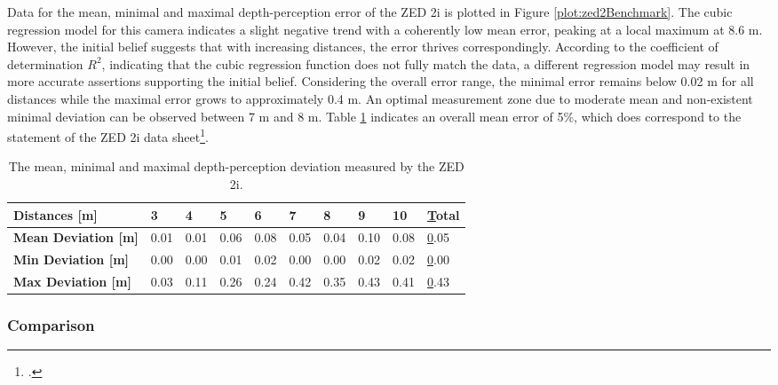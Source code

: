 Data for the mean, minimal and maximal depth-perception error of the ZED 2i is plotted in Figure \ref{plot:zed2Benchmark}.
The cubic regression model for this camera indicates a slight negative trend with a coherently low mean error, peaking at a local maximum at 8.6 m. However, the initial belief suggests that with increasing distances, the error thrives correspondingly. According to the coefficient of determination $R^{2}$, indicating that the cubic regression function does not fully match the data, a different regression model may result in more accurate assertions supporting the initial belief. 
Considering the overall error range, the minimal error remains below 0.02 m for all distances while the maximal error grows to approximately 0.4 m. 
An optimal measurement zone due to moderate mean and non-existent minimal deviation can be observed between 7 m and 8 m. 
Table \ref{tab:resultsZed2} indicates an overall mean error of 5\%, which does correspond to the statement of the ZED 2i data sheet\footcite{zed2Datasheet}.



\begin{table}[h]
	\centering
	\begin{tabular}{|l|l|l|l|l|l|l|l|l|l|}
		\hline
		\textbf{Distances {[}m{]}}      & 3    & 4    & 5    & 6    & 7    & 8    & 9    & 10   & {\ul Total} \\ \hline
		\textbf{Mean Deviation {[}m{]}} & 0.01 & 0.01 & 0.06 & 0.08 & 0.05 & 0.04 & 0.10 & 0.08 & {\ul 0.05}  \\ \hline
		\textbf{Min Deviation {[}m{]}}  & 0.00 & 0.00 & 0.01 & 0.02 & 0.00 & 0.00 & 0.02 & 0.02 & {\ul 0.00}  \\ \hline
		\textbf{Max Deviation {[}m{]}}  & 0.03 & 0.11 & 0.26 & 0.24 & 0.42 & 0.35 & 0.43 & 0.41 & {\ul 0.43}  \\ \hline
	\end{tabular}
	\caption{The mean, minimal and maximal depth-perception deviation measured by the ZED 2i.}
	\label{tab:resultsZed2}
\end{table}




\subsubsection{Comparison}

